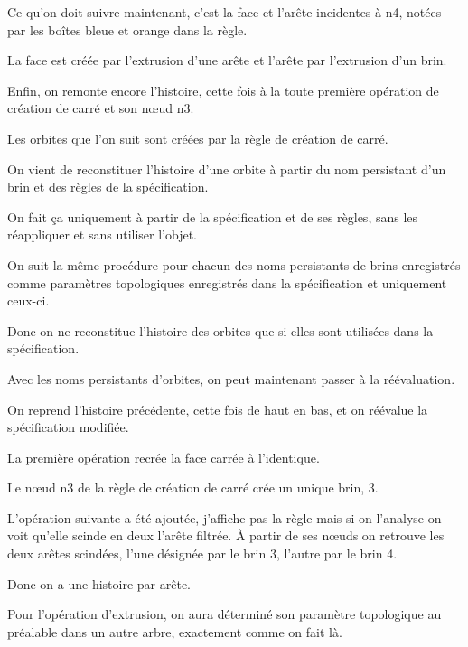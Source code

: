 \documentclass[a4paper]{article}
\begin{document}
Ce qu'on doit suivre maintenant, c'est la face et l'arête incidentes à n4, notées par les boîtes bleue et orange dans la règle.

La face est créée par l'extrusion d'une arête et l'arête par l'extrusion d'un brin.

Enfin, on remonte encore l'histoire, cette fois à la toute première opération de création de carré et son nœud n3.

Les orbites que l'on suit sont créées par la règle de création de carré.

On vient de reconstituer l'histoire d'une orbite à partir du nom persistant d'un brin et des règles de la spécification.

On fait ça uniquement à partir de la spécification et de ses règles, sans les réappliquer et sans utiliser l'objet.

On suit la même procédure pour chacun des noms persistants de brins enregistrés comme paramètres topologiques enregistrés dans la spécification et uniquement ceux-ci.


Donc on ne reconstitue l'histoire des orbites que si elles sont utilisées dans la spécification.

Avec les noms persistants d'orbites, on peut maintenant passer à la réévaluation.






On reprend l'histoire précédente, cette fois de haut en bas, et on réévalue
la spécification modifiée. %

La première opération recrée la face carrée à l'identique.

Le nœud n3 de la règle de création de carré crée un unique brin, 3.

L'opération suivante a été ajoutée, j'affiche pas la règle mais si on l'analyse on voit qu'elle scinde en deux l'arête filtrée.
À partir de ses nœuds on retrouve les deux arêtes scindées, l'une désignée par le brin 3, l'autre par le brin 4.

Donc on a une histoire par arête. %

Pour l'opération d'extrusion, on aura déterminé son paramètre topologique au
préalable dans un autre arbre, exactement comme on fait là.
\end{document}
